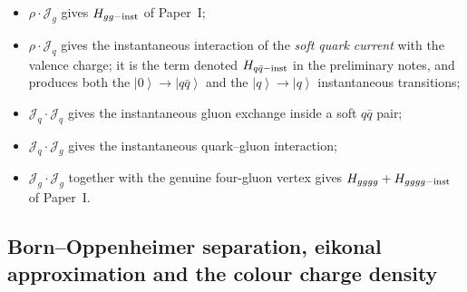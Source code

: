 \documentclass[11pt]{article}
\newcommand{\ket}[1]{\left|#1\right\rangle}
\newcommand{\vac}{\ket{0}}
\newcommand{\Hgggg}{H_{gggg}}
\begin{document}
\begin{itemize}
\item $\rho\!\cdot\!\mathcal J_g$ gives $H_{gg-{\rm inst}}$ of Paper~I;
\item $\rho\!\cdot\!\mathcal J_q$ gives the instantaneous interaction of the {\em soft quark
current} with the valence charge; it is the term denoted $H_{q\bar q-{\rm inst}}$ in the
preliminary notes, and produces both the $\vac\to\ket{q\bar q}$ and the $\ket{q}\to\ket{q}$
instantaneous transitions;
\item $\mathcal J_q\!\cdot\!\mathcal J_q$ gives the instantaneous gluon exchange inside a soft
$q\bar q$ pair;
\item $\mathcal J_q\!\cdot\!\mathcal J_g$ gives the instantaneous quark--gluon interaction;
\item $\mathcal J_g\!\cdot\!\mathcal J_g$ together with the genuine four-gluon vertex gives
$\Hgggg+H_{gggg-{\rm inst}}$ of Paper~I.
\end{itemize}

\subsection{Born--Oppenheimer separation, eikonal approximation and the colour charge density}
\label{sec:BO}
\end{document}
